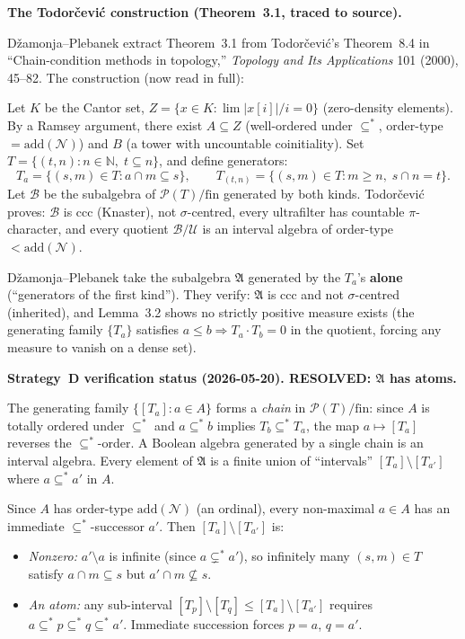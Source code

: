 \medskip\noindent
\textbf{The Todor\v{c}evi\'{c} construction (Theorem~3.1, traced to
source).}

D\v{z}amonja--Plebanek extract Theorem~3.1 from Todor\v{c}evi\'{c}'s
Theorem~8.4 in ``Chain-condition methods in topology,''
\emph{Topology and Its Applications} 101 (2000), 45--82.  The
construction (now read in full):

\smallskip\noindent
Let $K$ be the Cantor set, $Z = \{x \in K : \lim |x[i]|/i = 0\}$
(zero-density elements).  By a Ramsey argument, there exist
$A \subseteq Z$ (well-ordered under $\subseteq^*$, order-type
$= \mathrm{add}(\mathcal{N})$) and $B$ (a tower with uncountable
coinitiality).  Set $T = \{(t,n) : n \in \mathbb{N},\;
t \subseteq n\}$, and define generators:
\[
  T_a = \{(s,m) \in T : a \cap m \subseteq s\}, \qquad
  T_{(t,n)} = \{(s,m) \in T : m \geq n,\; s \cap n = t\}.
\]
Let $\mathcal{B}$ be the subalgebra of $\mathcal{P}(T)/\mathrm{fin}$
generated by both kinds.  Todor\v{c}evi\'{c} proves: $\mathcal{B}$
is ccc (Knaster), not $\sigma$-centred, every ultrafilter has
countable $\pi$-character, and every quotient $\mathcal{B}/\mathcal{U}$
is an interval algebra of order-type $< \mathrm{add}(\mathcal{N})$.

D\v{z}amonja--Plebanek take the subalgebra $\mathfrak{A}$ generated
by the $T_a$'s \textbf{alone} (``generators of the first kind'').
They verify: $\mathfrak{A}$ is ccc and not $\sigma$-centred (inherited),
and Lemma~3.2 shows no strictly positive measure exists (the generating
family $\{T_a\}$ satisfies $a \leq b \Rightarrow T_a \cdot T_b = 0$
in the quotient, forcing any measure to vanish on a dense set).

\medskip\noindent
\textbf{Strategy~D verification status (2026-05-20).  RESOLVED:
$\mathfrak{A}$ has atoms.}

The generating family $\{[T_a] : a \in A\}$ forms a \emph{chain}
in $\mathcal{P}(T)/\mathrm{fin}$: since $A$ is totally ordered
under $\subseteq^*$ and $a \subseteq^* b$ implies $T_b \subseteq^*
T_a$, the map $a \mapsto [T_a]$ reverses the $\subseteq^*$-order.
A Boolean algebra generated by a single chain is an interval algebra.
Every element of $\mathfrak{A}$ is a finite union of ``intervals''
$[T_a] \setminus [T_{a'}]$ where $a \subseteq^* a'$ in $A$.

Since $A$ has order-type $\mathrm{add}(\mathcal{N})$ (an ordinal),
every non-maximal $a \in A$ has an immediate $\subseteq^*$-successor
$a'$.  Then $[T_a] \setminus [T_{a'}]$ is:
\begin{itemize}[nosep]
  \item \emph{Nonzero:} $a' \setminus a$ is infinite (since
    $a \subsetneq^* a'$), so infinitely many $(s,m) \in T$ satisfy
    $a \cap m \subseteq s$ but $a' \cap m \not\subseteq s$.
  \item \emph{An atom:} any sub-interval $[T_p] \setminus [T_q]
    \leq [T_a] \setminus [T_{a'}]$ requires
    $a \subseteq^* p \subseteq^* q \subseteq^* a'$.  Immediate
    succession forces $p = a$, $q = a'$.
\end{itemize}

